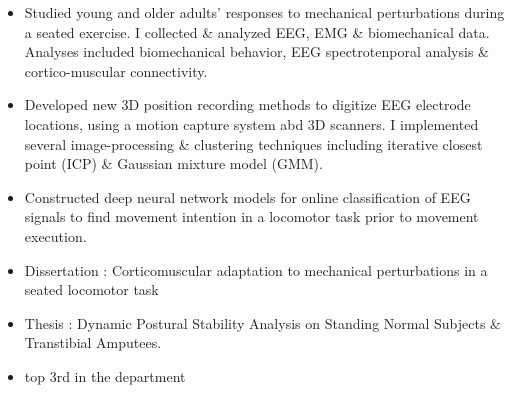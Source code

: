 \documentclass[10pt,letter,ragged2e]{altacv}
\begin{document}
\begin{itemize}
\item Studied young and older adults' responses to mechanical perturbations during a seated exercise. I collected \& analyzed EEG, EMG \& biomechanical data. Analyses included biomechanical behavior, EEG spectrotenporal analysis \& cortico-muscular connectivity.
\item Developed new 3D position recording methods to digitize EEG electrode locations, using a motion capture system abd 3D scanners. I implemented several image-processing \& clustering techniques including iterative closest point (ICP) \& Gaussian mixture model (GMM).

\item Constructed deep neural network models for online classification of EEG signals to find movement intention in a locomotor task prior to movement execution.
\end{itemize}



\begin{itemize}
\item Dissertation : Corticomuscular adaptation to mechanical perturbations in a seated locomotor task
\end{itemize}

\divider

\begin{itemize}
\item Thesis : Dynamic Postural Stability Analysis on Standing Normal Subjects \& Transtibial Amputees.
\end{itemize}

\divider

\begin{itemize}
\item top 3rd in the department
\end{itemize}

\clearpage


\nocite{*}
\end{document}
